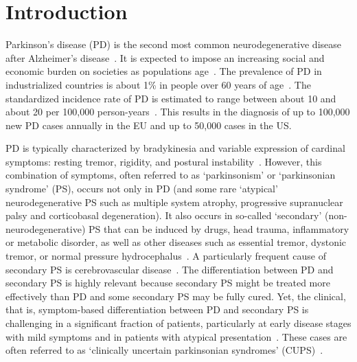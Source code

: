 \section{Introduction}
\label{sec:intro}


Parkinson's disease (PD) is the second most common neurodegenerative disease after Alzheimer's disease~\citep{Twelves2003}. 
It is expected to impose an increasing social and economic burden on societies as populations age~\citep{DeLau2006}. 
The prevalence of PD in industrialized countries is about 1\% in people over 60 years of age~\citep{DeLau2006}. 
The standardized incidence rate of PD is estimated to range between about 10 and about 20 per 100,000 person-years~\citep{DeLau2006}. 
This results in the diagnosis of up to 100,000 new PD cases annually in the EU and up to 50,000 cases in the US.


PD is typically characterized by bradykinesia and variable expression of cardinal symptoms: 
resting tremor, rigidity, and postural instability~\citep{Tolosa2006, Gibb1988}.
However, this combination of symptoms, often referred to as `parkinsonism' or `parkinsonian syndrome' (PS), 
occurs not only in PD (and some rare `atypical' neurodegenerative PS such as multiple system atrophy, progressive 
supranuclear palsy and corticobasal degeneration). 
It also occurs in so-called `secondary' (non-neurodegenerative) PS that can be induced by drugs, head trauma, 
inflammatory or metabolic disorder, as well as other diseases such as essential tremor, dystonic tremor, or normal pressure hydrocephalus~\citep{Tolosa2006, Piccini2004}.
A particularly frequent cause of secondary PS is cerebrovascular disease~\citep{Funke2013}.
The differentiation between PD and secondary PS is highly relevant 
because secondary PS might be treated more effectively than PD and some secondary PS may be fully cured.
Yet, the clinical, that is, symptom-based differentiation between PD and secondary PS is challenging in a significant fraction of patients, 
particularly at early disease stages with mild symptoms and in patients with atypical presentation~\citep{Hughes2002, Hughes1992}.
These cases are often referred to as `clinically uncertain parkinsonian syndromes' (CUPS)~\citep{Catafau2004}.


